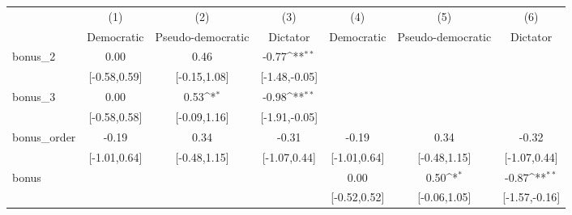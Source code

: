 {
\def\sym#1{\ifmmode^{#1}\else\(^{#1}\)\fi}
\begin{tabular}{l*{6}{c}}
\toprule
            &\multicolumn{1}{c}{(1)}        &\multicolumn{1}{c}{(2)}        &\multicolumn{1}{c}{(3)}        &\multicolumn{1}{c}{(4)}        &\multicolumn{1}{c}{(5)}        &\multicolumn{1}{c}{(6)}        \\
            &\multicolumn{1}{c}{Democratic} &\multicolumn{1}{c}{Pseudo-democratic}&\multicolumn{1}{c}{Dictator}   &\multicolumn{1}{c}{Democratic} &\multicolumn{1}{c}{Pseudo-democratic}&\multicolumn{1}{c}{Dictator}   \\
\midrule
bonus\_2     &                  0.00         &                  0.46         &                 -0.77\sym{**} &                               &                               &                               \\
            &          [-0.58,0.59]         &          [-0.15,1.08]         &         [-1.48,-0.05]         &                               &                               &                               \\
\addlinespace
bonus\_3     &                  0.00         &                  0.53\sym{*}  &                 -0.98\sym{**} &                               &                               &                               \\
            &          [-0.58,0.58]         &          [-0.09,1.16]         &         [-1.91,-0.05]         &                               &                               &                               \\
\addlinespace
bonus\_order &                 -0.19         &                  0.34         &                 -0.31         &                 -0.19         &                  0.34         &                 -0.32         \\
            &          [-1.01,0.64]         &          [-0.48,1.15]         &          [-1.07,0.44]         &          [-1.01,0.64]         &          [-0.48,1.15]         &          [-1.07,0.44]         \\
\addlinespace
bonus       &                               &                               &                               &                  0.00         &                  0.50\sym{*}  &                 -0.87\sym{**} \\
            &                               &                               &                               &          [-0.52,0.52]         &          [-0.06,1.05]         &         [-1.57,-0.16]         \\

\end{tabular}}
